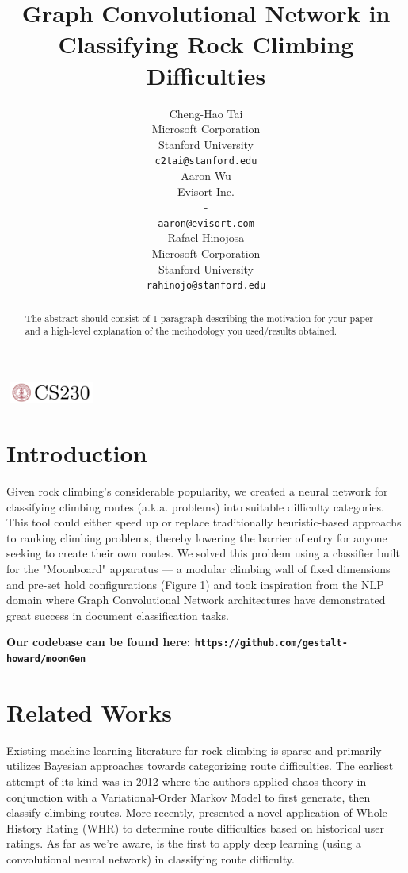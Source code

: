 \documentclass{article}
\title{Graph Convolutional Network in Classifying Rock Climbing Difficulties}
\author{
  Cheng-Hao Tai \\
  Microsoft Corporation \\
  Stanford University \\
  \texttt{c2tai@stanford.edu} \\
  \And
  Aaron Wu \\
  Evisort Inc. \\
  - \\
  \texttt{aaron@evisort.com} \\
  \And
  Rafael Hinojosa \\
  Microsoft Corporation \\
  Stanford University \\
  \texttt{rahinojo@stanford.edu} \\
}
\begin{document}
\begin{center}
\includegraphics[width=3cm, height=0.7cm]{CS230}
\end{center}

\maketitle

\begin{abstract}
The abstract should consist of 1 paragraph describing the motivation for your paper and a high-level explanation of the methodology you used/results obtained.
\end{abstract}

\section{Introduction}	
Given rock climbing's considerable popularity, we created a neural network for classifying climbing routes (a.k.a. problems) into suitable difficulty categories. This tool could either speed up or replace traditionally heuristic-based approachs to ranking climbing problems, thereby lowering the barrier of entry for anyone seeking to create their own routes. We solved this problem using a classifier built for the "Moonboard" apparatus --- a modular climbing wall of fixed dimensions and pre-set hold configurations (Figure 1) and took inspiration from the NLP domain where Graph Convolutional Network architectures have demonstrated great success in document classification tasks.

{\small\textbf{Our codebase can be found here: \texttt{https://github.com/gestalt-howard/moonGen}}}

\section{Related Works}
Existing machine learning literature for rock climbing is sparse and primarily utilizes Bayesian approaches towards categorizing route difficulties. The earliest attempt of its kind was in 2012 \cite{Phillips_2012} where the authors applied chaos theory in conjunction with a Variational-Order Markov Model to first generate, then classify climbing routes. More recently, \cite{scarff2020estimation} presented a novel application of Whole-History Rating (WHR) \cite{RemiCoulomWHR} to determine route difficulties based on historical user ratings. As far as we're aware, \cite{DoblesCS229} is the first to apply deep learning (using a convolutional neural network) in classifying route difficulty.
\end{document}
